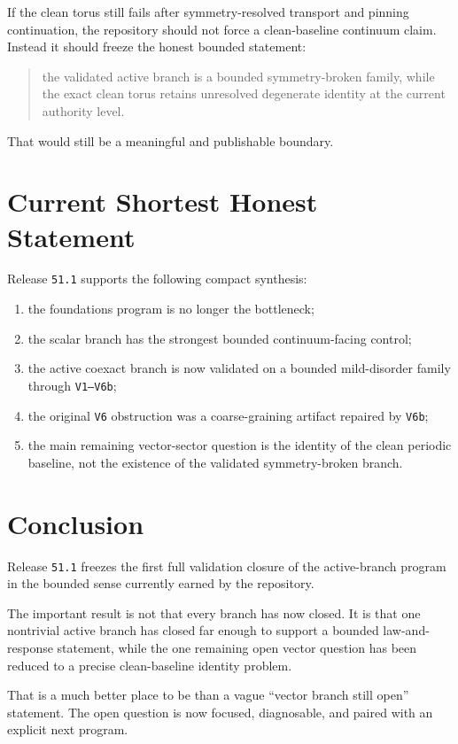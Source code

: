 \documentclass[11pt]{article}
\begin{document}
If the clean torus still fails after symmetry-resolved transport and pinning continuation, the repository should not force a clean-baseline continuum claim. Instead it should freeze the honest bounded statement:
\begin{quote}
the validated active branch is a bounded symmetry-broken family, while the exact clean torus retains unresolved degenerate identity at the current authority level.
\end{quote}

That would still be a meaningful and publishable boundary.

\section{Current Shortest Honest Statement}

Release \texttt{51.1} supports the following compact synthesis:

\begin{enumerate}
\item the foundations program is no longer the bottleneck;
\item the scalar branch has the strongest bounded continuum-facing control;
\item the active coexact branch is now validated on a bounded mild-disorder family through \texttt{V1--V6b};
\item the original \texttt{V6} obstruction was a coarse-graining artifact repaired by \texttt{V6b};
\item the main remaining vector-sector question is the identity of the clean periodic baseline, not the existence of the validated symmetry-broken branch.
\end{enumerate}

\section{Conclusion}

Release \texttt{51.1} freezes the first full validation closure of the active-branch program in the bounded sense currently earned by the repository.

The important result is not that every branch has now closed. It is that one nontrivial active branch has closed far enough to support a bounded law-and-response statement, while the one remaining open vector question has been reduced to a precise clean-baseline identity problem.

That is a much better place to be than a vague ``vector branch still open'' statement. The open question is now focused, diagnosable, and paired with an explicit next program.
\end{document}
